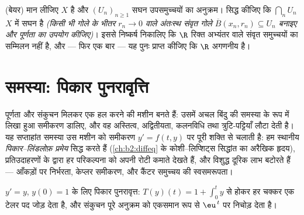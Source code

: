 \begin{exercise}[$\star\star\star$]\label{exo:b2:metric:12}
(बेयर) मान लीजिए $X$  है और $(U_n)_{n\geq1}$ सघन 
उपसमुच्चयों का अनुक्रम। सिद्ध कीजिए कि $\bigcap_n U_n$ $X$ में सघन है \emph{(किसी
भी गोले के भीतर $r_n \to 0$ वाले अंतःस्थ संवृत गोले $\overline B(x_n, r_n) \subseteq U_n$ बनाइए और पूर्णता का
उपयोग कीजिए)}। इससे निष्कर्ष निकालिए कि $\R$ रिक्त अभ्यंतर वाले संवृत
समुच्चयों का  सम्मिलन नहीं है, और --- फिर एक बार --- यह पुनः
प्राप्त कीजिए कि $\R$ अगणनीय है।
\end{exercise}

\section{समस्या: पिकार पुनरावृत्ति}

पूर्णता और संकुचन मिलकर एक हल करने की मशीन बनते हैं: उसमें अचल बिंदु की
समस्या के रूप में लिखा हुआ समीकरण डालिए, और वह अस्तित्व, अद्वितीयता,
कलनविधि तथा त्रुटि-पट्टियाँ लौटा देती है। यह सप्ताहांत समस्या उस मशीन
को समीकरण $y' = f(t,
y)$ पर पूरी शक्ति से चलाती है: हम स्थानीय
\emph{पिकार--लिंडलोफ़ प्रमेय} सिद्ध करते हैं (\cref{ch:b2:diffeq} के कोशी--लिप्शिट्स
सिद्धांत का अरैखिक हृदय), प्रतिउदाहरणों के द्वारा हर परिकल्पना को अपनी
रोटी कमाते देखते हैं, और विशुद्ध दूरिक लाभ बटोरते हैं --- आँकड़ों पर
 निर्भरता, केप्लर समीकरण, और कैंटर समुच्चय की स्वसमरूपता।

\begin{omfigure}

{\small $y' = y$, $y(0) = 1$ के लिए पिकार पुनरावृत्त: $T(y)(t) = 1 + \int_0^t y$ से होकर हर चक्कर एक टेलर
पद जोड़ देता है, और संकुचन पूरे अनुक्रम को एकसमान रूप से $\eu^{\,t}$ पर निचोड़
देता है।}
\end{omfigure}


